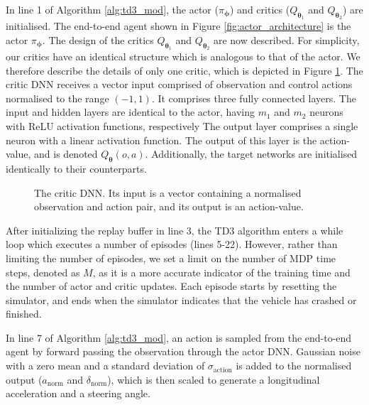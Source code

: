 In line 1 of Algorithm \ref{alg:td3_mod}, the actor ($\pi_{\bm{\phi}}$) and critics ($Q_{\bm{\theta}_1}$ and $Q_{\bm{\theta}_2}$) are initialised.
The end-to-end agent shown in Figure \ref{fig:actor_architecture} is the actor $\pi_{\bm{\phi}}$.
The design of the critics $Q_{\bm{\theta}_1}$ and $Q_{\bm{\theta}_2}$ are now described.
For simplicity, our critics have an identical structure which is analogous to that of the actor.
We therefore describe the details of only one critic, which is depicted in Figure \ref{fig:critic_architecture}.
The critic DNN receives a vector input comprised of observation and control actions normalised to the range $(-1,1)$. 
It comprises three fully connected layers.
The input and hidden layers are identical to the actor, having $m_1$ and $m_2$ neurons with ReLU activation functions, respectively
The output layer comprises a single neuron with a linear activation function.
The output of this layer is the action-value, and is denoted $Q_{\bm{\theta}}(o,a)$.
Additionally, the target networks are initialised identically to their counterparts.

\begin{figure}[htb!]
    \centering
    
    \caption[The critic DNN]{The critic DNN. Its input is a vector containing a normalised observation and action pair, and its output is an action-value.}
    \label{fig:critic_architecture}
\end{figure}

After initializing the replay buffer in line 3, the TD3 algorithm enters a while loop which executes a number of episodes (lines 5-22). 
However, rather than limiting the number of episodes, we set a limit on the number of MDP time steps, denoted as $M$, as it is a more accurate indicator of the training time and the number of actor and critic updates. 
Each episode starts by resetting the simulator, and ends when the simulator indicates that the vehicle has crashed or finished.


In line 7 of Algorithm \ref{alg:td3_mod}, an action is sampled from the end-to-end agent by forward passing the observation through the actor DNN.
Gaussian noise with a zero mean and a standard deviation of $\sigma_{\text{action}}$ is added to the normalised output ($a_{\text{norm}}$ and $\delta_{\text{norm}}$), which is then scaled to generate a longitudinal acceleration and a steering angle.

